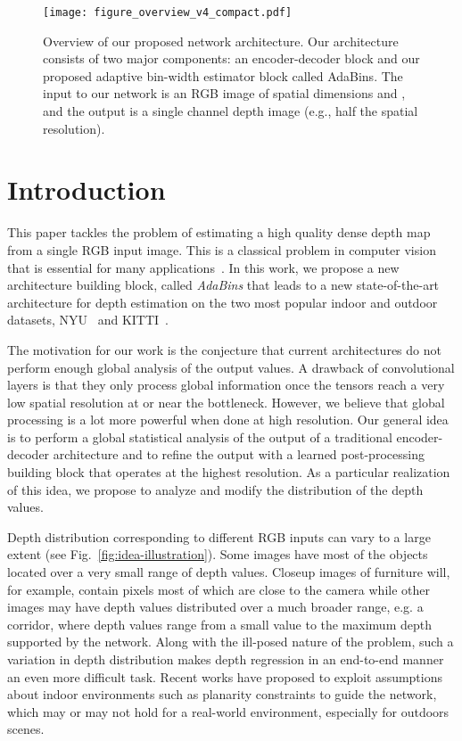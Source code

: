 \documentclass[final]{cvpr}
\begin{document}
\begin{figure*}[t]
\centering
   \texttt{[image: figure\_overview\_v4\_compact.pdf]}
   \caption{Overview of our proposed network architecture. Our architecture consists of two major components: an encoder-decoder block and our proposed adaptive bin-width estimator block called AdaBins. The input to our network is an RGB image of spatial dimensions  and , and the output is a single channel  depth image (e.g., half the spatial resolution).}
\label{fig:arch}
\end{figure*}


\section{Introduction}

This paper tackles the problem of estimating a high quality dense depth map from a single RGB input image. This is a classical problem in computer vision that is essential for many applications~\cite{Lee2011,moreno2007active,Hazirbas2016FuseNetID,DepthLab2020}.
In this work, we propose a new architecture building block, called \emph{AdaBins} that leads to a new state-of-the-art architecture for depth estimation on the two most popular indoor and outdoor datasets, NYU~\cite{Silberman2012} and KITTI~\cite{geiger2013vision}.

The motivation for our work is the conjecture that current architectures do not perform enough global analysis of the output values. A drawback of convolutional layers is that they only process global information once the tensors reach a very low spatial resolution at or near the bottleneck. However, we believe that global processing is a lot more powerful when done at high resolution. Our general idea is to perform a global statistical analysis of the output of a traditional encoder-decoder architecture and to refine the output with a learned post-processing building block that operates at the highest resolution. As a particular realization of this idea, we propose to analyze and modify the distribution of the depth values.

Depth distribution corresponding to different RGB inputs can vary to a large extent (see Fig.~\ref{fig:idea-illustration}). Some images have most of the objects located over a very small range of depth values. Closeup images of furniture will, for example, contain pixels most of which are close to the camera while other images may have depth values distributed over a much broader range, e.g. a corridor, where depth values range from a small value to the maximum depth supported by the network. Along with the ill-posed nature of the problem, such a variation in depth distribution makes depth regression in an end-to-end manner an even more difficult task. Recent works have proposed to exploit assumptions about indoor environments such as planarity constraints \cite{bts_lee2019big,dav_huynh2020guiding} to guide the network, which may or may not hold for a real-world environment, especially for outdoors scenes. 
\end{document}
